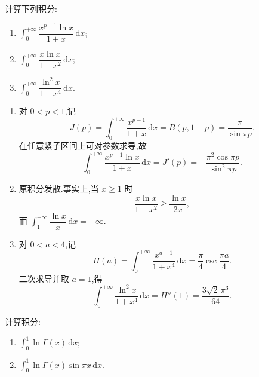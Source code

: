 \begin{example}
    计算下列积分:
    \begin{enumerate}
        \item $\displaystyle\int_0^{+\infty}\dfrac{x^{p-1}\ln x}{1+x}\,\mathrm{d}x$;
        \item $\displaystyle\int_0^{+\infty}\dfrac{x\ln x}{1+x^2}\,\mathrm{d}x$;
        \item $\displaystyle\int_0^{+\infty}\dfrac{\ln^2x}{1+x^4}\,\mathrm{d}x$.
    \end{enumerate}
\end{example}
\exampleblank

\begin{solution}
    \leavevmode
    \begin{enumerate}
        \item 对 $0<p<1$,记
              \[
                  J(p)=\int_0^{+\infty}\dfrac{x^{p-1}}{1+x}\,\mathrm{d}x
                  =B(p,1-p)=\dfrac{\pi}{\sin\pi p}.
              \]
              在任意紧子区间上可对参数求导,故
              \[
                  \displaystyle\int_0^{+\infty}\dfrac{x^{p-1}\ln x}{1+x}\,\mathrm{d}x
                  =J'(p)=-\dfrac{\pi^2\cos\pi p}{\sin^2\pi p}.
              \]
        \item 原积分发散.事实上,当 $x\geq1$ 时
              \[
                  \dfrac{x\ln x}{1+x^2}\geq\dfrac{\ln x}{2x},
              \]
              而 $\displaystyle\int_1^{+\infty}\dfrac{\ln x}{x}\,\mathrm{d}x=+\infty$.
        \item 对 $0<a<4$,记
              \[
                  H(a)=\int_0^{+\infty}\dfrac{x^{a-1}}{1+x^4}\,\mathrm{d}x
                  =\dfrac{\pi}{4}\csc\dfrac{\pi a}{4}.
              \]
              二次求导并取 $a=1$,得
              \[
                  \displaystyle\int_0^{+\infty}\dfrac{\ln^2x}{1+x^4}\,\mathrm{d}x
                  =H''(1)=\dfrac{3\sqrt2\,\pi^3}{64}.
              \]
    \end{enumerate}
\end{solution}

\begin{example}
    计算积分:
    \begin{enumerate}
        \item $\displaystyle\int_0^1\ln\Gamma(x)\,\mathrm{d}x$;
        \item $\displaystyle\int_0^1\ln\Gamma(x)\sin\pi x\,\mathrm{d}x$.
    \end{enumerate}
\end{example}
\exampleblank

